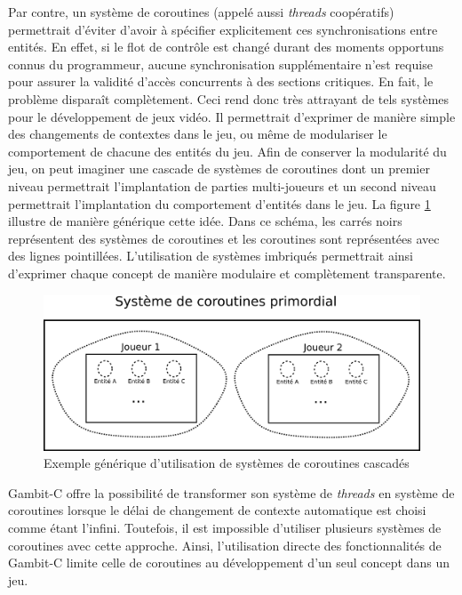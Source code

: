 \documentclass[12pt,twoside,letterpaper,francais]{book}
\begin{document}
Par contre, un système de coroutines (appelé aussi \textit{threads}
coopératifs) permettrait d'éviter d'avoir à spécifier explicitement
ces synchronisations entre entités. En effet, si le flot de contrôle
est changé durant des moments opportuns connus du programmeur, aucune
synchronisation supplémentaire n'est requise pour assurer la validité
d'accès concurrents à des sections critiques. En fait, le problème
disparaît complètement. Ceci rend donc très attrayant de tels systèmes
pour le développement de jeux vidéo. Il permettrait d'exprimer de
manière simple des changements de contextes dans le jeu, ou même de
modulariser le comportement de chacune des entités du jeu. Afin de
conserver la modularité du jeu, on peut imaginer une cascade de
systèmes de coroutines dont un premier niveau permettrait
l'implantation de parties multi-joueurs et un second niveau
permettrait l'implantation du comportement d'entités dans le jeu. La
figure \ref{Corout:usecase} illustre de manière générique cette
idée. Dans ce schéma, les carrés noirs représentent des systèmes de
coroutines et les coroutines sont représentées avec des lignes
pointillées. L'utilisation de systèmes imbriqués permettrait ainsi
d'exprimer chaque concept de manière modulaire et complètement
transparente.\\

\begin{figure}[htb!]
  \center
  \includegraphics[scale=1.2]{corout-usecase-design}
  \caption{Exemple générique d'utilisation de systèmes de coroutines
    cascadés}
  \label{Corout:usecase}
\end{figure}

Gambit-C offre la possibilité de transformer son système de
\textit{threads} en système de coroutines lorsque le délai de
changement de contexte automatique est choisi comme étant
l'infini. Toutefois, il est impossible d'utiliser plusieurs systèmes
de coroutines avec cette approche. Ainsi, l'utilisation directe des
fonctionnalités de Gambit-C limite celle de coroutines au
développement d'un seul concept dans un jeu.
\end{document}
